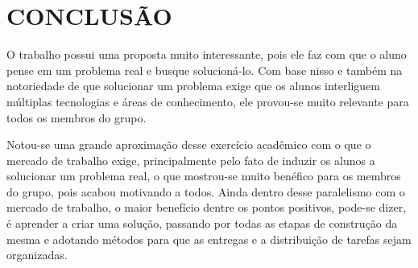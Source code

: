\chapter{CONCLUSÃO}
\label{chap:conclusao}







O trabalho possui uma proposta muito interessante, pois ele faz com que o aluno pense em um problema real e busque solucioná-lo. Com base nisso e também na notoriedade de que solucionar um problema exige que os alunos interliguem múltiplas tecnologias e áreas de conhecimento, ele provou-se muito relevante para todos os membros do grupo.

Notou-se uma grande aproximação desse exercício acadêmico com o que o mercado de trabalho exige, principalmente pelo fato de induzir os alunos a solucionar um problema real, o que mostrou-se muito benéfico para os membros do grupo, pois acabou motivando a todos. Ainda dentro desse paralelismo com o mercado de trabalho, o maior benefício dentre os pontos positivos, pode-se dizer, é aprender a criar uma solução, passando por todas as etapas de construção da mesma e adotando métodos para que as entregas e a distribuição de tarefas sejam organizadas.

